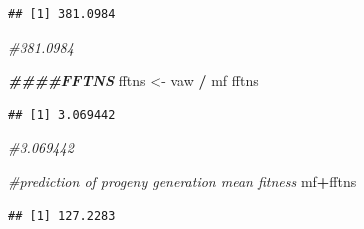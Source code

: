 \documentclass[
]{article}
\newenvironment{Shaded}{\begin{snugshade}}{\end{snugshade}}
\newcommand{\CommentTok}[1]{\textcolor[rgb]{0.56,0.35,0.01}{\textit{#1}}}
\newcommand{\DocumentationTok}[1]{\textcolor[rgb]{0.56,0.35,0.01}{\textbf{\textit{#1}}}}
\newcommand{\NormalTok}[1]{#1}
\newcommand{\OtherTok}[1]{\textcolor[rgb]{0.56,0.35,0.01}{#1}}
\newcommand{\SpecialCharTok}[1]{\textcolor[rgb]{0.81,0.36,0.00}{\textbf{#1}}}
\begin{document}
\begin{verbatim}
## [1] 381.0984
\end{verbatim}

\begin{Shaded}
\begin{Highlighting}[]
\CommentTok{\#381.0984}

\DocumentationTok{\#\#\#\#FFTNS}
\NormalTok{fftns }\OtherTok{\textless{}{-}}\NormalTok{ vaw }\SpecialCharTok{/}\NormalTok{ mf}
\NormalTok{fftns}
\end{Highlighting}
\end{Shaded}

\begin{verbatim}
## [1] 3.069442
\end{verbatim}

\begin{Shaded}
\begin{Highlighting}[]
\CommentTok{\#3.069442}

\CommentTok{\#prediction of progeny generation mean fitness}
\NormalTok{mf}\SpecialCharTok{+}\NormalTok{fftns}
\end{Highlighting}
\end{Shaded}

\begin{verbatim}
## [1] 127.2283
\end{verbatim}
\end{document}
